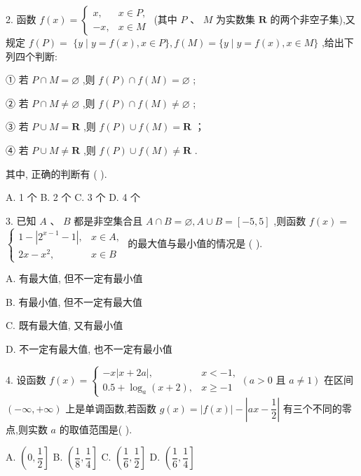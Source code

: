 2. 函数 $f\left( x\right)  = \left\{  \begin{array}{ll} x, & x \in  P, \\   - x, & x \in  M \end{array}\right.$ (其中 $P\text{ 、 }M$ 为实数集 $\mathbf{R}$ 的两个非空子集),又规定 $f\left( P\right)  =$  $\{ y \mid  y = f\left( x\right) ,x \in  P\} ,f\left( M\right)  = \{ y \mid  y = f\left( x\right) ,x \in  M\}$ ,给出下列四个判断:

① 若 $P \cap  M = \varnothing$ ,则 $f\left( P\right)  \cap  f\left( M\right)  = \varnothing$ ;

② 若 $P \cap  M \neq  \varnothing$ ,则 $f\left( P\right)  \cap  f\left( M\right)  \neq  \varnothing$ ;

③ 若 $P \cup  M = \mathbf{R}$ ,则 $f\left( P\right)  \cup  f\left( M\right)  = \mathbf{R}$ ；

④ 若 $P \cup  M \neq  \mathbf{R}$ ,则 $f\left( P\right)  \cup  f\left( M\right)  \neq  \mathbf{R}$ .

其中, 正确的判断有 (   ).

A. 1 个 B. 2 个 C. 3 个 D. 4 个

3. 已知 $A$ 、 $B$ 都是非空集合且 $A \cap  B = \varnothing ,A \cup  B = \left\lbrack  {-5,5}\right\rbrack$ ,则函数 $f\left( x\right)  =$  $\left\{  \begin{array}{ll} 1 - \left| {{2}^{x - 1} - 1}\right| , & x \in  A, \\  {2x} - {x}^{2}, & x \in  B \end{array}\right.$ 的最大值与最小值的情况是 (   ).

A. 有最大值, 但不一定有最小值

B. 有最小值, 但不一定有最大值

C. 既有最大值, 又有最小值

D. 不一定有最大值, 也不一定有最小值

4. 设函数 $f\left( x\right)  = \left\{  {\begin{array}{ll}  - x\left| {x + {2a}}\right| , & x <  - 1, \\  {0.5} + {\log }_{a}\left( {x + 2}\right) , & x \geq   - 1 \end{array}\left( {a > 0\text{ 且 }a \neq  1}\right) }\right.$ 在区间 $\left( {-\infty , + \infty }\right)$ 上是单调函数,若函数 $g\left( x\right)  = \left| {f\left( x\right) }\right|  - \left| {{ax} - \dfrac{1}{2}}\right|$ 有三个不同的零点,则实数 $a$ 的取值范围是(   ).

A. $\left( {0,\dfrac{1}{2}}\right\rbrack$ B. $\left( {\dfrac{1}{8},\dfrac{1}{4}}\right\rbrack$ C. $\left( {\dfrac{1}{6},\dfrac{1}{2}}\right\rbrack$ D. $\left( {\dfrac{1}{6},\dfrac{1}{4}}\right\rbrack$

